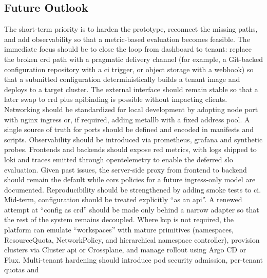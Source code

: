 \documentclass[11pt, a4paper, oneside, listof=totoc]{scrartcl}
\begin{document}
        \subsection{Future Outlook}\label{subsec:outlook}
            The short-term priority is to harden the prototype, reconnect the missing paths, and add
            observability so that a metric-based evaluation becomes feasible.
            The immediate focus should be to close the loop from dashboard to tenant: replace the
            broken \gls{crd} path with a pragmatic delivery channel (for example, a Git-backed
            configuration repository with a \gls{ci} trigger, or object storage with a webhook) so
            that a submitted configuration deterministically builds a tenant image and deploys to a
            target cluster.
            The external interface should remain stable so that a later swap to \gls{crd} plus
            \gls{apibinding} is possible without impacting clients.
            Networking should be standardized for local development by adopting node port with nginx
            \gls{ingress} or, if required, adding \gls{metallb} with a fixed address pool.
            A single source of truth for ports should be defined and encoded in manifests and
            scripts.
            Observability should be introduced via \gls{prometheus}, \gls{grafana} and synthetic probes.
            Frontends and backends should expose \gls{red} metrics, with logs shipped to \gls{loki} and
            traces emitted through \gls{opentelemetry} to enable the deferred \gls{slo} evaluation.
            Given past issues, the server-side proxy from frontend to backend should remain the
            default while \gls{cors} policies for a future \gls{ingress}-only model are documented.
            Reproducibility should be strengthened by adding smoke tests to \gls{ci}.\\
            Mid-term, configuration should be treated explicitly \enquote{as an \gls{api}}.
            A renewed attempt at \enquote{config as \gls{crd}} should be made only behind a narrow
            adapter so that the rest of the system remains decoupled.
            Where \gls{kcp} is not required, the platform can emulate \enquote{workspaces} with
            mature primitives (namespaces, ResourceQuota, NetworkPolicy, and hierarchical namespace
            controller), provision clusters via Cluster \gls{api} or Crossplane, and manage rollout
            using Argo CD or Flux.
            Multi-tenant hardening should introduce pod security admission, per-tenant quotas and
\end{document}
